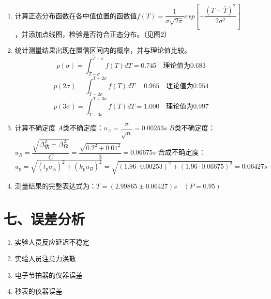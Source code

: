 \documentclass[11pt]{article}
\begin{document}
\begin{enumerate}
\begin{figure}[H]
    \hspace{0.5in}
    \hspace{0.5in}
    \end{figure}
    \item 计算正态分布函数在各中值位置的函数值$f(T)=\dfrac{1}{\sigma\sqrt{2\pi}}exp\left[-\dfrac{\left(T-\overline{T}\right)^2}{2\sigma^2}\right]$，并添加点线图，检验是否符合正态分布。（见图2）
    \item 统计测量结果出现在置信区间内的概率，并与理论值比较。
    $$
    p(\sigma)=\int_{\overline{T}-\sigma}^{\overline{T}+\sigma}f(T)dT=0.745\quad\text{理论值为}0.683
    $$
    $$
    p(2\sigma)=\int_{\overline{T}-2\sigma}^{\overline{T}+2\sigma}f(T)dT=0.965\quad\text{理论值为}0.954
    $$
    $$
    p(3\sigma)=\int_{\overline{T}-3\sigma}^{\overline{T}+3\sigma}f(T)dT=1.000\quad\text{理论值为}0.997
    $$
    \item 计算不确定度
    $A$类不确定度：$u_A=\dfrac{\sigma}{\sqrt{n}}=0.00253s$
    $B$类不确定度：$u_B=\dfrac{\sqrt{\Delta_{\text{估}}^2+\Delta_{\text{仪}}^2}}{C}=\dfrac{\sqrt{0.2^2+0.01^2}}{3}=0.06675s$
    合成不确定度：$u_p=\sqrt{(t_pu_A)^2+(k_pu_B)^2}=\sqrt{(1.96\cdot0.00253)^2+(1.96\cdot0.06675)^2}=0.06427s$
    \item 测量结果的完整表达式为：$T=(2.99865\pm0.06427)s\quad(P=0.95)$
\end{enumerate}

\section*{七、误差分析}

\begin{enumerate}
    \item 实验人员反应延迟不稳定
    \item 实验人员注意力涣散
    \item 电子节拍器的仪器误差
    \item 秒表的仪器误差
\end{enumerate}
\end{document}
